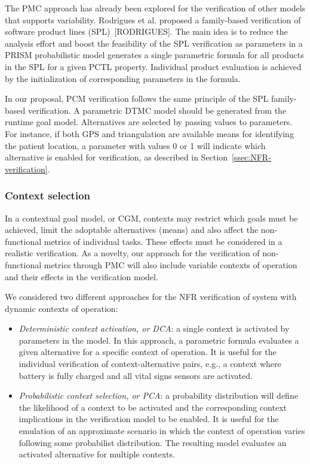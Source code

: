 The PMC approach has already been explored for the verification of other models that supports variability. Rodrigues et al. proposed a family-based verification of software product lines (SPL)~[RODRIGUES]. The main idea is to reduce the analysis effort and boost the feasibility of the SPL verification as parameters in a PRISM probabilistic model generates a single parametric formula for all products in the SPL for a given PCTL property. Individual product evaluation is achieved by the initialization of corresponding parameters in the formula. 

In our proposal, PCM verification follows the same principle of the SPL family-based verification. A parametric DTMC model should be generated from the runtime goal model. Alternatives are selected by passing values to parameters. For instance, if both GPS and triangulation are available means for identifying the patient location, a parameter with values 0 or 1 will indicate which alternative is enabled for verification, as described in Section~\ref{ssec:NFR-verification}.

\subsubsection{Context selection}

In a contextual goal model, or CGM, contexts may restrict which goals must be achieved, limit the adoptable alternatives (means) and also affect the non-functional metrics of individual tasks. These effects must be considered in a realistic verification. As a novelty, our approach for the verification of non-functional metrics through PMC will also include variable contexts of operation and their effects in the verification model. 

We considered two different approaches for the NFR verification of system with dynamic contexts of operation:

\begin{itemize}

\item \textit{Deterministic context activation, or DCA}: a single context is activated by parameters in the model. In this approach, a parametric formula evaluates a given alternative for a specific context of operation. It is useful for the individual verification of context-alternative pairs, e.g., a context where battery is fully charged and all vital signs sensors are activated.
\medskip

\item \textit{Probabilistic context selection, or PCA}: a probability distribution will define the likelihood of a context to be activated and the corresponding context implications in the verification model to be enabled. It is useful for the emulation of an approximate scenario in which the context of operation varies following some probabilist distribution. The resulting model evaluates an activated alternative for multiple contexts. 

\end{itemize}

